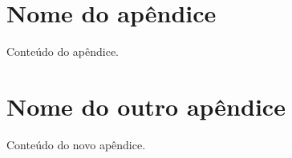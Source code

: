 \begin{apendicesenv}
\partapendices

\chapter{Nome do apêndice}
\label{chap:apendiceA}

Conteúdo do apêndice.

\chapter{Nome do outro apêndice}
\label{chap:apendiceB}

Conteúdo do novo apêndice.

\end{apendicesenv}

